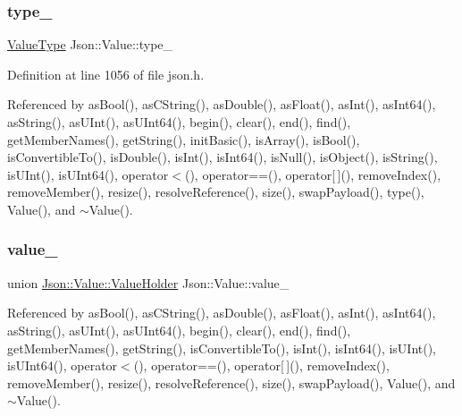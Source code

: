 \mbox{\label{class_json_1_1_value_abd222c2536dc88bf330dedcd076d2356}} 
\subsubsection{\texorpdfstring{type\+\_\+}{type\_}}
{\footnotesize\ttfamily \hyperlink{namespace_json_a7d654b75c16a57007925868e38212b4e}{Value\+Type} Json\+::\+Value\+::type\+\_\+\hspace{0.3cm}{\ttfamily [private]}}



Definition at line 1056 of file json.\+h.



Referenced by as\+Bool(), as\+C\+String(), as\+Double(), as\+Float(), as\+Int(), as\+Int64(), as\+String(), as\+U\+Int(), as\+U\+Int64(), begin(), clear(), end(), find(), get\+Member\+Names(), get\+String(), init\+Basic(), is\+Array(), is\+Bool(), is\+Convertible\+To(), is\+Double(), is\+Int(), is\+Int64(), is\+Null(), is\+Object(), is\+String(), is\+U\+Int(), is\+U\+Int64(), operator$<$(), operator==(), operator\mbox{[}$\,$\mbox{]}(), remove\+Index(), remove\+Member(), resize(), resolve\+Reference(), size(), swap\+Payload(), type(), Value(), and $\sim$\+Value().

\mbox{\label{class_json_1_1_value_aef578244546212705b9f81eb84d7e151}} 
\subsubsection{\texorpdfstring{value\+\_\+}{value\_}}
{\footnotesize\ttfamily union \hyperlink{union_json_1_1_value_1_1_value_holder}{Json\+::\+Value\+::\+Value\+Holder}  Json\+::\+Value\+::value\+\_\+\hspace{0.3cm}{\ttfamily [private]}}



Referenced by as\+Bool(), as\+C\+String(), as\+Double(), as\+Float(), as\+Int(), as\+Int64(), as\+String(), as\+U\+Int(), as\+U\+Int64(), begin(), clear(), end(), find(), get\+Member\+Names(), get\+String(), is\+Convertible\+To(), is\+Int(), is\+Int64(), is\+U\+Int(), is\+U\+Int64(), operator$<$(), operator==(), operator\mbox{[}$\,$\mbox{]}(), remove\+Index(), remove\+Member(), resize(), resolve\+Reference(), size(), swap\+Payload(), Value(), and $\sim$\+Value().



